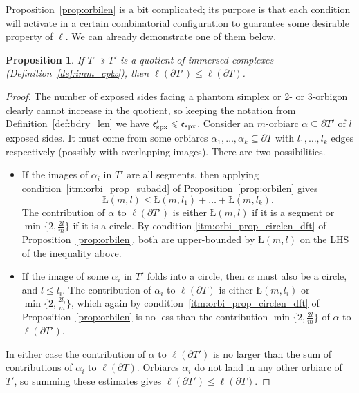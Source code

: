 \documentclass{amsart}
\newtheorem{proposition}[conjecture]{Proposition}
\newcommand{\tn}{\textnormal}
\begin{document}
Proposition~\ref{prop:orbilen} is a bit complicated; its purpose is that each condition will activate in a certain combinatorial configuration to guarantee some desirable property of $\ell$. We can already demonstrate one of them below.
\begin{proposition}\label{prop:quot_short_bdry}
If $T\twoheadrightarrow T'$ is a quotient of immersed complexes (Definition~\ref{def:imm_cplx}), then $\ell(\partial T')\leqslant\ell(\partial T)$.
\end{proposition}
\begin{proof}
The number of exposed sides facing a phantom simplex or 2- or 3-orbigon clearly cannot increase in the quotient, so keeping the notation from Definition~\ref{def:bdry_len} we have $\mathfrak{e}_\tn{spx}'\leqslant\mathfrak{e}_\tn{spx}$. Consider an $m$-orbiarc $\alpha\subseteq\partial T'$ of $l$ exposed sides. It must come from some orbiarcs $\alpha_1,\dots,\alpha_k\subseteq\partial T$ with $l_1,\dots,l_k$ edges respectively (possibly with overlapping images). There are two possibilities.
\begin{itemize}
\item If the images of $\alpha_i$ in $T'$ are all segments, then applying condition~\ref*{itm:orbi_prop_subadd} of Proposition~\ref{prop:orbilen} gives
\begin{equation*}
Ł(m,l)\leqslant Ł(m,l_1)+\dots+Ł(m,l_k).
\end{equation*}
The contribution of $\alpha$ to $\ell(\partial T')$ is either $Ł(m,l)$ if it is a segment or $\min\{2,\tfrac{2l}{m}\}$ if it is a circle. By condition \ref*{itm:orbi_prop_circlen_dft} of Proposition~\ref{prop:orbilen}, both are upper-bounded by $Ł(m,l)$ on the LHS of the inequality above.
\item If the image of some $\alpha_i$ in $T'$ folds into a circle, then $\alpha$ must also be a circle, and $l\leqslant l_i$. The contribution of $\alpha_i$ to $\ell(\partial T)$ is either $Ł(m,l_i)$ or $\min\{2,\tfrac{2l_i}{m}\}$, which again by condition~\ref*{itm:orbi_prop_circlen_dft} of Proposition~\ref{prop:orbilen} is no less than the contribution $\min\{2,\tfrac{2l}{m}\}$ of $\alpha$ to $\ell(\partial T')$.
\end{itemize}
In either case the contribution of $\alpha$ to $\ell(\partial T')$ is no larger than the sum of contributions of $\alpha_i$ to $\ell(\partial T)$. Orbiarcs $\alpha_i$ do not land in any other orbiarc of $T'$, so summing these estimates gives $\ell(\partial T')\leqslant\ell(\partial T)$.
\end{proof}
\end{document}
